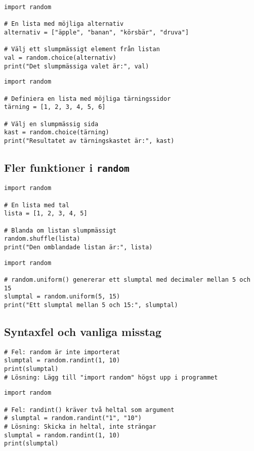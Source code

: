 \begin{lstlisting}[title=Exempel 5: Välja ett slumpmässigt element från en lista]
import random

# En lista med möjliga alternativ
alternativ = ["äpple", "banan", "körsbär", "druva"]

# Välj ett slumpmässigt element från listan
val = random.choice(alternativ)
print("Det slumpmässiga valet är:", val)
\end{lstlisting}

\begin{lstlisting}[title=Exempel 6: Simulera ett tärningskast med \texttt{random.choice()}]
import random

# Definiera en lista med möjliga tärningssidor
tärning = [1, 2, 3, 4, 5, 6]

# Välj en slumpmässig sida
kast = random.choice(tärning)
print("Resultatet av tärningskastet är:", kast)
\end{lstlisting}

\subsection*{Fler funktioner i \texttt{random}}

\begin{lstlisting}[title=Exempel 7: Slumpa om en lista med \texttt{random.shuffle()}]
import random

# En lista med tal
lista = [1, 2, 3, 4, 5]

# Blanda om listan slumpmässigt
random.shuffle(lista)
print("Den omblandade listan är:", lista)
\end{lstlisting}

\begin{lstlisting}[title=Exempel 8: Generera ett slumptal inom ett intervall med decimaler]
import random

# random.uniform() genererar ett slumptal med decimaler mellan 5 och 15
slumptal = random.uniform(5, 15)
print("Ett slumptal mellan 5 och 15:", slumptal)
\end{lstlisting}

\subsection*{Syntaxfel och vanliga misstag}

\begin{lstlisting}[title=Exempel 9: Glöm inte att importera modulen!]
# Fel: random är inte importerat
slumptal = random.randint(1, 10)
print(slumptal)
# Lösning: Lägg till "import random" högst upp i programmet
\end{lstlisting}

\begin{lstlisting}[title=Exempel 10: Fel typ av argument till \texttt{randint()}]
import random

# Fel: randint() kräver två heltal som argument
# slumptal = random.randint("1", "10")
# Lösning: Skicka in heltal, inte strängar
slumptal = random.randint(1, 10)
print(slumptal)
\end{lstlisting}
